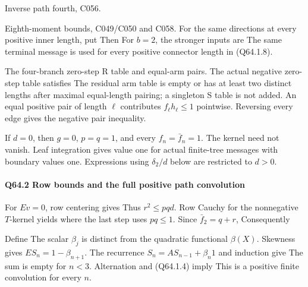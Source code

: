 Inverse path fourth, C056.


Eighth-moment bounds, C049/C050 and C058. For the same
directions at every positive inner length, put
Then
For \(b=2\), the stronger inputs are
The same terminal message is used for every positive connector length in (Q64.1.8).

The four-branch zero-step R table and equal-arm pairs. The actual
negative zero-step table satisfies
The residual arm table is empty or has at least two distinct lengths
after maximal equal-length pairing; a singleton S table is not added.
An equal positive pair of length \(\ell\) contributes
\(f_\ell h_\ell\le1\) pointwise. Reversing every edge gives the
negative pair inequality.

If \(d=0\), then \(g=0\), \(p=q=1\), and every \(f_n=\bar f_n=1\).
The kernel need not vanish. Leaf integration gives value one for
actual finite-tree messages with boundary values one. Expressions
using \(\delta_2/d\) below are restricted to \(d>0\).

\paragraph{Q64.2 Row bounds and the full positive path convolution}

For \(Ev=0\), row centering gives
Thus \(r^2\le pqd\). Row Cauchy for the nonnegative \(T\)-kernel yields
where the last step uses \(pq\le1\). Since \(\bar f_2=q+r\),
Consequently

Define
The scalar \(\beta_j\) is distinct from the quadratic functional
\(\beta(X)\). Skewness gives \(ES_n=1-\beta_{n+1}\).
The recurrence \(S_n=AS_{n-1}+\beta_n1\) and induction give
The sum is empty for \(n<3\). Alternation and (Q64.1.4) imply
This is a positive finite convolution for every \(n\).

